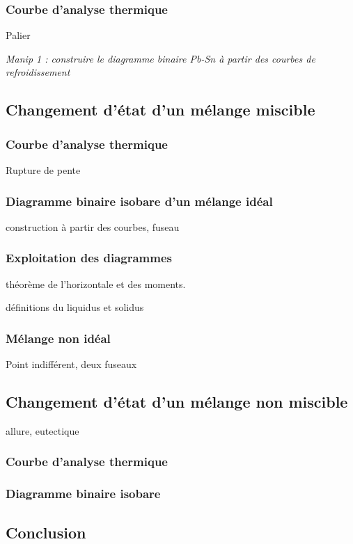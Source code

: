 \documentclass{article}%
\begin{document}
\subsubsection{Courbe d'analyse thermique}
Palier

\textit{Manip 1 : construire le diagramme binaire Pb-Sn à partir des courbes de refroidissement}

\subsection{Changement d'état d'un mélange miscible}


\subsubsection{Courbe d'analyse thermique}
Rupture de pente
\subsubsection{Diagramme binaire isobare d'un mélange idéal}
construction à partir des courbes, fuseau
\subsubsection{Exploitation des diagrammes}
théorème de l'horizontale et des moments.

définitions du liquidus et solidus
\subsubsection{Mélange non idéal}

Point indifférent, deux fuseaux

\subsection{Changement d'état d'un mélange non miscible}

allure, eutectique

\subsubsection{Courbe d'analyse thermique}
\subsubsection{Diagramme binaire isobare}

\subsection{Conclusion} 
\end{document}
